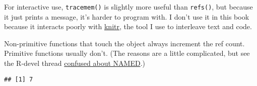 \begin{Shaded}
\begin{Highlighting}[]
\StringTok{ }\OperatorTok{:}

\NormalTok{x[}\NormalTok{] <-}\StringTok{ }

\StringTok{ }
\NormalTok{x[}\NormalTok{] <-}\StringTok{ }
\end{Highlighting}
\end{Shaded}

For interactive use, \texttt{tracemem()} is slightly more useful than
\texttt{refs()}, but because it just prints a message, it's harder to
program with. I don't use it in this book because it interacts poorly
with \href{http://yihui.name/knitr/}{knitr}, the tool I use to
interleave text and code.

Non-primitive functions that touch the object always increment the ref
count. Primitive functions usually don't. (The reasons are a little
complicated, but see the R-devel thread
\href{http://r.789695.n4.nabble.com/Confused-about-NAMED-td4103326.html}{confused
about NAMED}.) 

\begin{Shaded}
\begin{Highlighting}[]
\StringTok{ }
\StringTok{ }\OperatorTok{:}\NormalTok{; }
\end{Highlighting}
\end{Shaded}

\begin{verbatim}
## [1] 7
\end{verbatim}

\begin{Shaded}
\begin{Highlighting}[]
\StringTok{ }\OperatorTok{:}\NormalTok{; }
\end{Highlighting}
\end{Shaded}

